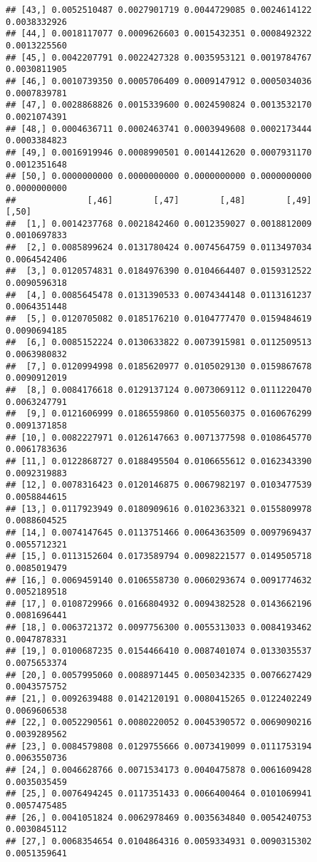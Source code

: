 \documentclass[]{article}
\begin{document}
\begin{verbatim}
## [43,] 0.0052510487 0.0027901719 0.0044729085 0.0024614122 0.0038332926
## [44,] 0.0018117077 0.0009626603 0.0015432351 0.0008492322 0.0013225560
## [45,] 0.0042207791 0.0022427328 0.0035953121 0.0019784767 0.0030811905
## [46,] 0.0010739350 0.0005706409 0.0009147912 0.0005034036 0.0007839781
## [47,] 0.0028868826 0.0015339600 0.0024590824 0.0013532170 0.0021074391
## [48,] 0.0004636711 0.0002463741 0.0003949608 0.0002173444 0.0003384823
## [49,] 0.0016919946 0.0008990501 0.0014412620 0.0007931170 0.0012351648
## [50,] 0.0000000000 0.0000000000 0.0000000000 0.0000000000 0.0000000000
##              [,46]        [,47]        [,48]        [,49]        [,50]
##  [1,] 0.0014237768 0.0021842460 0.0012359027 0.0018812009 0.0010697833
##  [2,] 0.0085899624 0.0131780424 0.0074564759 0.0113497034 0.0064542406
##  [3,] 0.0120574831 0.0184976390 0.0104664407 0.0159312522 0.0090596318
##  [4,] 0.0085645478 0.0131390533 0.0074344148 0.0113161237 0.0064351448
##  [5,] 0.0120705082 0.0185176210 0.0104777470 0.0159484619 0.0090694185
##  [6,] 0.0085152224 0.0130633822 0.0073915981 0.0112509513 0.0063980832
##  [7,] 0.0120994998 0.0185620977 0.0105029130 0.0159867678 0.0090912019
##  [8,] 0.0084176618 0.0129137124 0.0073069112 0.0111220470 0.0063247791
##  [9,] 0.0121606999 0.0186559860 0.0105560375 0.0160676299 0.0091371858
## [10,] 0.0082227971 0.0126147663 0.0071377598 0.0108645770 0.0061783636
## [11,] 0.0122868727 0.0188495504 0.0106655612 0.0162343390 0.0092319883
## [12,] 0.0078316423 0.0120146875 0.0067982197 0.0103477539 0.0058844615
## [13,] 0.0117923949 0.0180909616 0.0102363321 0.0155809978 0.0088604525
## [14,] 0.0074147645 0.0113751466 0.0064363509 0.0097969437 0.0055712321
## [15,] 0.0113152604 0.0173589794 0.0098221577 0.0149505718 0.0085019479
## [16,] 0.0069459140 0.0106558730 0.0060293674 0.0091774632 0.0052189518
## [17,] 0.0108729966 0.0166804932 0.0094382528 0.0143662196 0.0081696441
## [18,] 0.0063721372 0.0097756300 0.0055313033 0.0084193462 0.0047878331
## [19,] 0.0100687235 0.0154466410 0.0087401074 0.0133035537 0.0075653374
## [20,] 0.0057995060 0.0088971445 0.0050342335 0.0076627429 0.0043575752
## [21,] 0.0092639488 0.0142120191 0.0080415265 0.0122402249 0.0069606538
## [22,] 0.0052290561 0.0080220052 0.0045390572 0.0069090216 0.0039289562
## [23,] 0.0084579808 0.0129755666 0.0073419099 0.0111753194 0.0063550736
## [24,] 0.0046628766 0.0071534173 0.0040475878 0.0061609428 0.0035035459
## [25,] 0.0076494245 0.0117351433 0.0066400464 0.0101069941 0.0057475485
## [26,] 0.0041051824 0.0062978469 0.0035634840 0.0054240753 0.0030845112
## [27,] 0.0068354654 0.0104864316 0.0059334931 0.0090315302 0.0051359641

\end{verbatim}
\end{document}
